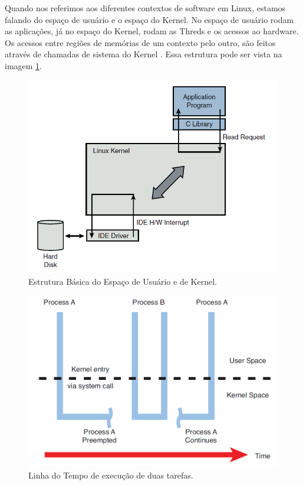 Quando nos referimos aos diferentes contextos de software em Linux, estamos falando do espaço de usuário e o espaço do Kernel. No espaço de usuário rodam as aplicações, já no espaço do Kernel, rodam as Threds e os acessos ao hardware. Os acessos entre regiões de memórias de um contexto pelo outro, são feitos através de chamadas de sistema do Kernel \cite{Prentice}. Essa estrutura pode ser vista na imagem \ref{fig:kernel_user_space}.

\begin{figure}[!ht]
  \caption{Estrutura Básica do Espaço de Usuário e de Kernel.}
  \begin{center}
      \includegraphics[scale=0.65]{img/kernel_user_space}
  \end{center}
  \label{fig:kernel_user_space}
\end{figure}


\begin{figure}[!ht]
  \caption{Linha do Tempo de execução de duas tarefas.}
  \begin{center}
      \includegraphics[scale=0.45]{img/escalonador_hallinan_p469}
  \end{center}
  \label{fig:escalonador_hallinan_p469}
\end{figure}
  

